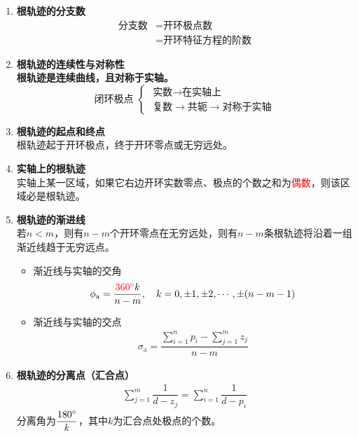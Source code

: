 \begin{enumerate}
	\item \textbf{根轨迹的分支数}
	\begin{align*}
		\mbox{分支数} &= \mbox{开环极点数}\\
		&=\mbox{开环特征方程的阶数}
	\end{align*}
	\item \textbf{根轨迹的连续性与对称性}\\
	\textbf{根轨迹是连续曲线，且对称于实轴。}
	\begin{equation*}
		\mbox{闭环极点} \,\,
		\begin{cases}
			\,\,\mbox{实数} \longrightarrow \mbox{在实轴上}\\
			\,\,\mbox{复数} \longrightarrow \mbox{共轭} \longrightarrow \mbox{对称于实轴}
		\end{cases}
	\end{equation*}
	
	\item \textbf{根轨迹的起点和终点}\\
	根轨迹起于开环极点，终于开环零点或无穷远处。\\
	
	\item \textbf{实轴上的根轨迹}\\
	实轴上某一区域，如果它右边开环实数零点、极点的个数之和为\textcolor{red}{偶数}，则该区域必是根轨迹。
	
	\item \textbf{根轨迹的渐进线}\\
	若$n < m$，则有$n - m$个开环零点在无穷远处，则有$n - m$条根轨迹将沿着一组渐近线趋于无穷远点。
	\begin{itemize}
		\item 渐近线与实轴的交角
		\begin{align}
			\phi_\text{a} = \dfrac{\textcolor{red}{360 {}^{\circ}} k}{n-m}, \quad k = 0,\pm 1,\pm 2, \cdots,\pm (n-m-1)
		\end{align}
		\item 渐近线与实轴的交点
		\begin{align}
			\sigma_\text{a} = \dfrac{\displaystyle \sum_{i =1}^n p_i - \sum_{j = 1}^m z_j}{n-m}
		\end{align}
	\end{itemize}
	
	\item \textbf{根轨迹的分离点（汇合点）}
		\begin{align}
			\sum_{j = 1}^{m} \dfrac{1}{d - z_j} = \sum_{i =1}^{n}\dfrac{1}{d - p_i}
		\end{align}
		分离角为$\dfrac{180 {}^{\circ}}{k}$，其中$k$为汇合点处极点的个数。
	

\end{enumerate}
